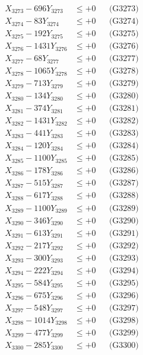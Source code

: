 \documentclass[a4paper,10pt]{article}
\begin{document}
{\begin{align}
X_{3273} - 696Y_{3273} &\leq +0 && \text{(G3273)} \\
X_{3274} - 83Y_{3274} &\leq +0 && \text{(G3274)} \\
X_{3275} - 192Y_{3275} &\leq +0 && \text{(G3275)} \\
X_{3276} - 1431Y_{3276} &\leq +0 && \text{(G3276)} \\
X_{3277} - 68Y_{3277} &\leq +0 && \text{(G3277)} \\
X_{3278} - 1065Y_{3278} &\leq +0 && \text{(G3278)} \\
X_{3279} - 713Y_{3279} &\leq +0 && \text{(G3279)} \\
X_{3280} - 134Y_{3280} &\leq +0 && \text{(G3280)} \\
\allowbreak
X_{3281} - 374Y_{3281} &\leq +0 && \text{(G3281)} \\
X_{3282} - 1431Y_{3282} &\leq +0 && \text{(G3282)} \\
X_{3283} - 441Y_{3283} &\leq +0 && \text{(G3283)} \\
X_{3284} - 120Y_{3284} &\leq +0 && \text{(G3284)} \\
X_{3285} - 1100Y_{3285} &\leq +0 && \text{(G3285)} \\
X_{3286} - 178Y_{3286} &\leq +0 && \text{(G3286)} \\
X_{3287} - 515Y_{3287} &\leq +0 && \text{(G3287)} \\
X_{3288} - 617Y_{3288} &\leq +0 && \text{(G3288)} \\
X_{3289} - 1100Y_{3289} &\leq +0 && \text{(G3289)} \\
X_{3290} - 346Y_{3290} &\leq +0 && \text{(G3290)} \\
\allowbreak
X_{3291} - 613Y_{3291} &\leq +0 && \text{(G3291)} \\
X_{3292} - 217Y_{3292} &\leq +0 && \text{(G3292)} \\
X_{3293} - 300Y_{3293} &\leq +0 && \text{(G3293)} \\
X_{3294} - 222Y_{3294} &\leq +0 && \text{(G3294)} \\
X_{3295} - 584Y_{3295} &\leq +0 && \text{(G3295)} \\
X_{3296} - 675Y_{3296} &\leq +0 && \text{(G3296)} \\
X_{3297} - 548Y_{3297} &\leq +0 && \text{(G3297)} \\
X_{3298} - 1014Y_{3298} &\leq +0 && \text{(G3298)} \\
X_{3299} - 477Y_{3299} &\leq +0 && \text{(G3299)} \\
X_{3300} - 285Y_{3300} &\leq +0 && \text{(G3300)} \\

\end{align}}
\end{document}
